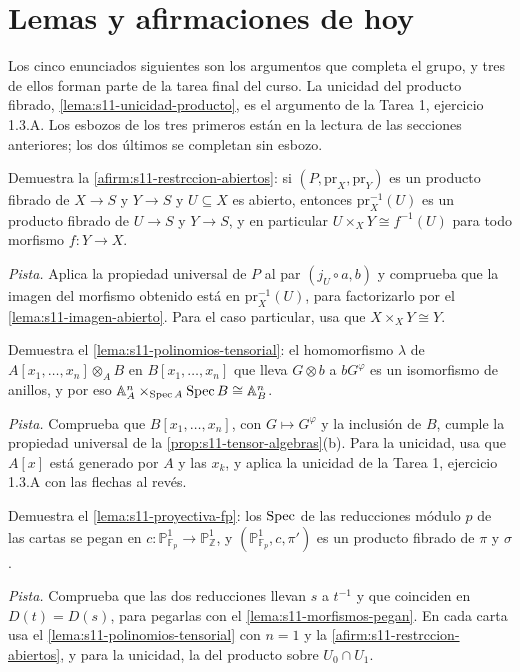 \section{Lemas y afirmaciones de hoy}
\label{sec:s11-lemas-hoy}

Los cinco enunciados siguientes son los argumentos que completa el grupo, y tres de ellos forman parte de la tarea final del curso. La unicidad del producto fibrado, \cref{lema:s11-unicidad-producto}, es el argumento de la Tarea 1, ejercicio 1.3.A. Los esbozos de los tres primeros están en la lectura de las secciones anteriores; los dos últimos se completan sin esbozo.

\begin{ejer}
\label{ejer:s11-restrccion-abiertos}
Demuestra la \cref{afirm:s11-restrccion-abiertos}: si \((P,\mathrm{pr}_X,\mathrm{pr}_Y)\) es un producto fibrado de \(X\to S\) y \(Y\to S\) y \(U\subseteq X\) es abierto, entonces \(\mathrm{pr}_X^{-1}(U)\) es un producto fibrado de \(U\to S\) y \(Y\to S\), y en particular \(U\times_XY\cong f^{-1}(U)\) para todo morfismo \(f\colon Y\to X\).

\emph{Pista.} Aplica la propiedad universal de \(P\) al par \((j_U\circ a,b)\) y comprueba que la imagen del morfismo obtenido está en \(\mathrm{pr}_X^{-1}(U)\), para factorizarlo por el \cref{lema:s11-imagen-abierto}. Para el caso particular, usa que \(X\times_XY\cong Y\).
\end{ejer}

\begin{ejer}
\label{ejer:s11-polinomios-tensorial}
Demuestra el \cref{lema:s11-polinomios-tensorial}: el homomorfismo \(\lambda\) de \(A[x_1,\ldots,x_n]\otimes_AB\) en \(B[x_1,\ldots,x_n]\) que lleva \(G\otimes b\) a \(bG^\varphi\) es un isomorfismo de anillos, y por eso \(\mathbb A_A^n\times_{\operatorname{Spec} A}\operatorname{Spec} B\cong\mathbb A_B^n\).

\emph{Pista.} Comprueba que \(B[x_1,\ldots,x_n]\), con \(G\mapsto G^\varphi\) y la inclusión de \(B\), cumple la propiedad universal de la \cref{prop:s11-tensor-algebras}(b). Para la unicidad, usa que \(A[x]\) está generado por \(A\) y las \(x_k\), y aplica la unicidad de la Tarea 1, ejercicio 1.3.A con las flechas al revés.
\end{ejer}

\begin{ejer}
\label{ejer:s11-proyectiva-fp}
Demuestra el \cref{lema:s11-proyectiva-fp}: los \(\operatorname{Spec}\) de las reducciones módulo \(p\) de las cartas se pegan en \(c\colon\mathbb P^1_{\mathbb F_p}\to\mathbb P^1_{\mathbb Z}\), y \((\mathbb P^1_{\mathbb F_p},c,\pi')\) es un producto fibrado de \(\pi\) y \(\sigma\).

\emph{Pista.} Comprueba que las dos reducciones llevan \(s\) a \(t^{-1}\) y que coinciden en \(D(t)=D(s)\), para pegarlas con el \cref{lema:s11-morfismos-pegan}. En cada carta usa el \cref{lema:s11-polinomios-tensorial} con \(n=1\) y la \cref{afirm:s11-restrccion-abiertos}, y para la unicidad, la del producto sobre \(U_0\cap U_1\).
\end{ejer}

